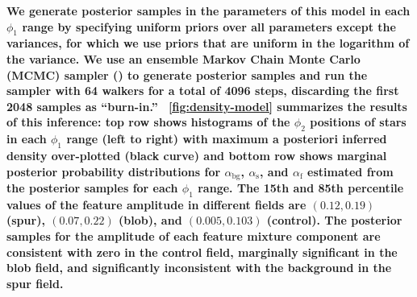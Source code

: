\documentclass[modern]{aastex62}
\newcommand{\changes}[1]{{\textbf{#1}}}
\begin{document}
\changes{
We generate posterior samples in the parameters of this model in each $\phi_1$ range by specifying uniform priors over all parameters except the variances, for which we use priors that are uniform in the logarithm of the variance.
We use an ensemble Markov Chain Monte Carlo (MCMC) sampler (\citealt{Foreman-Mackey:2013}) to generate posterior samples and run the sampler with 64 walkers for a total of 4096 steps, discarding the first 2048 samples as ``burn-in.''
\figurename~\ref{fig:density-model} summarizes the results of this inference: top row shows histograms of the $\phi_2$ positions of stars in each $\phi_1$ range (left to right) with maximum a posteriori inferred density over-plotted (black curve) and bottom row shows marginal posterior probability distributions for $\alpha_{\textrm{bg}}$, $\alpha_{\textrm{s}}$, and $\alpha_{\textrm{f}}$ estimated from the posterior samples for each $\phi_1$ range.
The 15th and 85th percentile values of the feature amplitude in different fields are $(0.12, 0.19)$ (spur), $(0.07, 0.22)$ (blob), and $(0.005, 0.103)$ (control).
The posterior samples for the amplitude of each feature mixture component are consistent with zero in the control field, marginally significant in the blob field, and significantly inconsistent with the background in the spur field.
}
\end{document}
